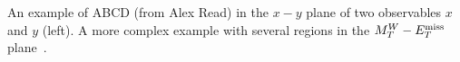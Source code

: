 An example of ABCD (from Alex Read) in the $x-y$ plane of two observables $x$ and $y$ (left).  A more complex example with several regions in the $M_T^W-E_T^{\rm miss}$ plane~\cite{ATLAS:2011ad}.